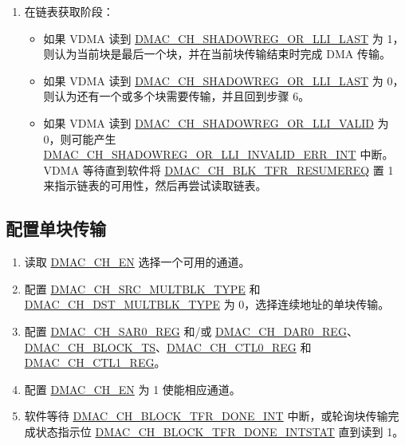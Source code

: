 \documentclass[main\_\_CN.tex]{subfiles}
\begin{document}
\begin{enumerate}
    \item 在链表获取阶段：

        \begin{itemize}
        \item 如果 VDMA 读到 \hyperref[fielddesc:DMACCHNSHADOWREGORLLILAST]{DMAC\_CH\_SHADOWREG\_OR\_LLI\_LAST} 为 1，则认为当前块是最后一个块，并在当前块传输结束时完成 DMA 传输。
        \item 如果 VDMA 读到 \hyperref[fielddesc:DMACCHNSHADOWREGORLLILAST]{DMAC\_CH\_SHADOWREG\_OR\_LLI\_LAST} 为 0，则认为还有一个或多个块需要传输，并且回到步骤 6。
        \item 如果 VDMA 读到 \hyperref[fielddesc:DMACCHNSHADOWREGORLLIVALID]{DMAC\_CH\_SHADOWREG\_OR\_LLI\_VALID} 为 0，则可能产生 \hyperref[int:DMACCHNSHADOWREGORLLIINVALIDERRINT]{DMAC\_CH\_SHADOWREG\_OR\_LLI\_INVALID\_ERR\_INT} 中断。VDMA 等待直到软件将 \hyperref[fielddesc:DMACCHNBLKTFRRESUMEREQ]{DMAC\_CH\_BLK\_TFR\_RESUMEREQ} 置 1 来指示链表的可用性，然后再尝试读取链表。
    \end{itemize}
\end{enumerate}

\subsection{配置单块传输}

\begin{enumerate}
    \item 读取 \hyperref[fielddesc:DMACCH1EN]{DMAC\_CH\_EN} 选择一个可用的通道。
    \item 配置 \hyperref[fielddesc:DMACCHNSRCMULTBLKTYPE]{DMAC\_CH\_SRC\_MULTBLK\_TYPE} 和 \hyperref[fielddesc:DMACCHNDSTMULTBLKTYPE]{DMAC\_CH\_DST\_MULTBLK\_TYPE} 为 0，选择连续地址的单块传输。
    \item 配置 \hyperref[regdesc:DMACCHNSAR0REG]{DMAC\_CH\_SAR0\_REG} 和/或 \hyperref[regdesc:DMACCHNDAR0REG]{DMAC\_CH\_DAR0\_REG}、 \hyperref[fielddesc:DMACCHNBLOCKTS]{DMAC\_CH\_BLOCK\_TS}、\hyperref[regdesc:DMACCHNCTL0REG]{DMAC\_CH\_CTL0\_REG} 和 \hyperref[regdesc:DMACCHNCTL1REG]{DMAC\_CH\_CTL1\_REG}。
    \item 配置 \hyperref[fielddesc:DMACCH1EN]{DMAC\_CH\_EN} 为 1 使能相应通道。

    \item 软件等待 \hyperref[int:DMACCHNBLOCKTFRDONEINT]{DMAC\_CH\_BLOCK\_TFR\_DONE\_INT} 中断，或轮询块传输完成状态指示位 \hyperref[fielddesc:DMACCHNBLOCKTFRDONEINTSTAT]{DMAC\_CH\_BLOCK\_TFR\_DONE\_INTSTAT} 直到读到 1。
\end{enumerate}
\end{document}
